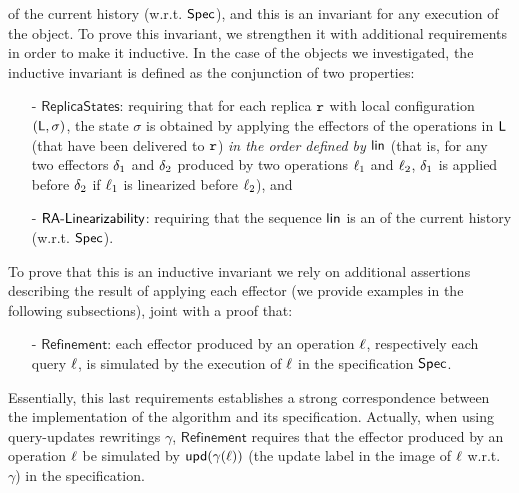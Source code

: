 \crdtlinearization{} of the current history (w.r.t. $\mathsf{Spec}{}$), and
this is an invariant for any execution of the object.
%
To prove this invariant, we strengthen it with additional requirements
in order to make it inductive.
%
In the case of the objects we investigated, the inductive invariant is
defined as the conjunction of two properties:
\begin{itemize}
\item[-] $\mathsf{ReplicaStates}$: requiring that for each replica
  $\mathtt{r}$ with local configuration $(\mathsf{L},\sigma)$, the state
  $\sigma$ is obtained by applying the effectors of the operations
  in $\mathsf{L}$ (that have been delivered to $\mathtt{r}$) \emph{in the order
  defined by $\mathsf{lin}$} (that is, for any two effectors $\delta_1$ and $\delta_2$ produced by two operations $\ell_1$ and $\ell_2$,  
  $\delta_1$ is applied  before $\delta_2$ if $\ell_1$ is linearized before $\ell_2$), and
\item[-] $\mathsf{RA\text{-}Linearizability{}}$: requiring that the sequence
  $\mathsf{lin}$ is an \crdtlinearization{} of the current history (w.r.t.
  $\mathsf{Spec}{}$).
\end{itemize}
To prove that this is an inductive invariant we rely on additional
assertions describing the result of applying each effector (we provide
examples in the following subsections), joint with a proof that:
\begin{itemize}
\item[-] $\mathsf{Refinement}$: each effector produced by an operation
  $\ell$, respectively each query $\ell$, is simulated by the
  execution of $\ell$ in the specification $\mathsf{Spec}$. 
\end{itemize}
Essentially, this last requirements establishes a strong
correspondence between the implementation of the algorithm and its
specification. Actually, when using query-updates rewritings $\gamma$, $\mathsf{Refinement}$ requires that 
the effector produced by an operation $\ell$ be simulated by $\mathsf{upd}(\gamma(\ell))$ 
(the update label in the image of $\ell$ w.r.t. $\gamma$) in the specification. 

